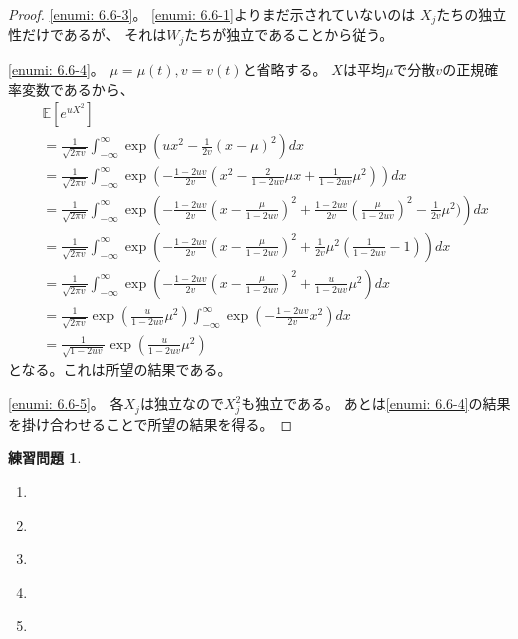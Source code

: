 \documentclass[uplatex]{jsarticle}
\theoremstyle{definition}
\newtheorem{prob}[prob]{練習問題}
\def\E{\mathbb{E}}
\begin{document}
\begin{proof}
  \ref{enumi: 6.6-3}。
  \ref{enumi: 6.6-1}よりまだ示されていないのは
  \(X_j\)たちの独立性だけであるが、
  それは\(W_j\)たちが独立であることから従う。

  \ref{enumi: 6.6-4}。
  \(\mu = \mu(t), v=v(t)\)と省略する。
  \(X\)は平均\(\mu\)で分散\(v\)の正規確率変数であるから、
  \begin{align*}
    &\E[e^{uX^2}] \\
    &= \frac{1}{\sqrt{2\pi v}}
    \int_{-\infty}^\infty \exp\left(
    ux^2 - \frac{1}{2v}(x-\mu)^2 \right)dx \\
    &= \frac{1}{\sqrt{2\pi v}}
    \int_{-\infty}^\infty \exp\left(
    - \frac{1-2uv}{2v}\left(x^2-\frac{2}{1-2uv}\mu x
    + \frac{1}{1-2uv}\mu^2\right) \right)dx \\
    &= \frac{1}{\sqrt{2\pi v}}
    \int_{-\infty}^\infty \exp\left(
    - \frac{1-2uv}{2v}\left(x-\frac{\mu}{1-2uv}\right)^2
    + \frac{1-2uv}{2v}\left( \frac{\mu}{1-2uv}\right)^2
    - \frac{1}{2v}\mu^2 ) \right)dx \\
    &= \frac{1}{\sqrt{2\pi v}}
    \int_{-\infty}^\infty \exp\left(
    - \frac{1-2uv}{2v}\left(x-\frac{\mu}{1-2uv}\right)^2
    + \frac{1}{2v}\mu^2\left( \frac{1}{1-2uv}-1 \right) \right)dx \\
    &= \frac{1}{\sqrt{2\pi v}}
    \int_{-\infty}^\infty \exp\left(
    - \frac{1-2uv}{2v}\left(x-\frac{\mu}{1-2uv}\right)^2
    + \frac{u}{1-2uv}\mu^2 \right)dx \\
    &= \frac{1}{\sqrt{2\pi v}}
    \exp\left(\frac{u}{1-2uv}\mu^2 \right)
    \int_{-\infty}^\infty \exp\left( - \frac{1-2uv}{2v}x^2\right) dx \\
    &= \frac{1}{\sqrt{1-2uv}}
    \exp\left(\frac{u}{1-2uv}\mu^2 \right)
  \end{align*}
  となる。これは所望の結果である。

  \ref{enumi: 6.6-5}。
  各\(X_j\)は独立なので\(X_j^2\)も独立である。
  あとは\ref{enumi: 6.6-4}の結果を掛け合わせることで所望の結果を得る。
\end{proof}


\begin{prob}\label{prob: 6.7}
  \begin{enumerate}
    \item \label{enumi: 6.7-1}
    \item \label{enumi: 6.7-2}
    \item \label{enumi: 6.7-3}
    \item \label{enumi: 6.7-4}
    \item \label{enumi: 6.7-5}
  \end{enumerate}
\end{prob}
\end{document}
